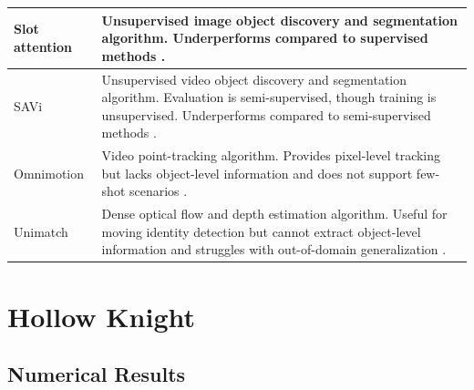 \begin{table}[h]
{\begin{tabular}{p{}p{}}
        \hline
        Slot attention & Unsupervised image object discovery and segmentation algorithm.
        Underperforms compared to supervised methods \citep{locatello_object-centric_2020}. \\
        \hline
        SAVi & Unsupervised video object discovery and segmentation algorithm.
        Evaluation is semi-supervised, though training is unsupervised. Underperforms compared to semi-supervised methods \citep{kipf_conditional_2022, elsayed_savi_2022}. \\
        \hline
        Omnimotion & Video point-tracking algorithm.
        Provides pixel-level tracking but lacks object-level information and does not support few-shot scenarios \citep{wang_tracking_2023}.\\
        \hline
        Unimatch & Dense optical flow and depth estimation algorithm.
        Useful for moving identity detection but cannot extract object-level information and struggles with out-of-domain generalization \citep{xu_unifying_2023}.\\
        \bottomrule
    \end{tabular}
  }
\end{table}

\section{Hollow Knight}
\subsection{Numerical Results} \label{sec:hollow-knight-numerical-results}

